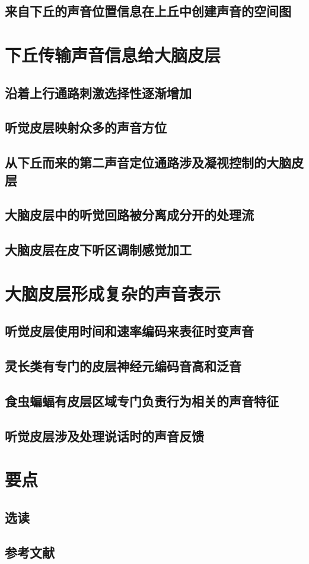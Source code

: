 \subsection{来自下丘的声音位置信息在上丘中创建声音的空间图}

\section{下丘传输声音信息给大脑皮层}
\subsection{沿着上行通路刺激选择性逐渐增加}
\subsection{听觉皮层映射众多的声音方位}
\subsection{从下丘而来的第二声音定位通路涉及凝视控制的大脑皮层}
\subsection{大脑皮层中的听觉回路被分离成分开的处理流}
\subsection{大脑皮层在皮下听区调制感觉加工}

\section{大脑皮层形成复杂的声音表示}
\subsection{听觉皮层使用时间和速率编码来表征时变声音}
\subsection{灵长类有专门的皮层神经元编码音高和泛音}
\subsection{食虫蝙蝠有皮层区域专门负责行为相关的声音特征}
\subsection{听觉皮层涉及处理说话时的声音反馈}

\section{要点}
\subsection{选读}
\subsection{参考文献}
